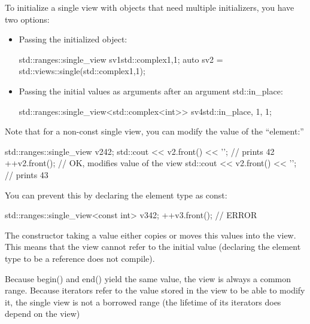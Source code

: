 To initialize a single view with objects that need multiple initializers, you have two options:

\begin{itemize}
\item
Passing the initialized object:

\begin{cpp}
std::ranges::single_view sv1{std::complex{1,1}};
auto sv2 = std::views::single(std::complex{1,1});
\end{cpp}

\item
Passing the initial values as arguments after an argument std::in\_place:

\begin{cpp}
std::ranges::single_view<std::complex<int>> sv4{std::in_place, 1, 1};
\end{cpp}
\end{itemize}

Note that for a non-const single view, you can modify the value of the “element:”

\begin{cpp}
std::ranges::single_view v2{42};
std::cout << v2.front() << '\n'; // prints 42
++v2.front(); // OK, modifies value of the view
std::cout << v2.front() << '\n'; // prints 43
\end{cpp}

You can prevent this by declaring the element type as const:

\begin{cpp}
std::ranges::single_view<const int> v3{42};
++v3.front(); // ERROR
\end{cpp}

The constructor taking a value either copies or moves this values into the view. This means that the view cannot refer to the initial value (declaring the element type to be a reference does not compile).

Because begin() and end() yield the same value, the view is always a common range. Because iterators refer to the value stored in the view to be able to modify it, the single view is not a borrowed range (the lifetime of its iterators does depend on the view)


